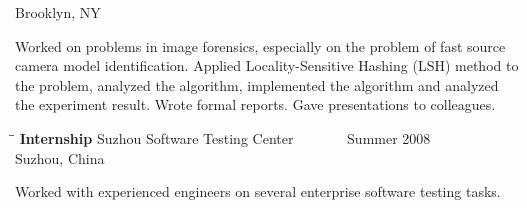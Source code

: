 \documentclass{res}
\begin{document}
\begin{resume}
\begin{tabbing}
                             \>Brooklyn, NY
   \end{tabbing}\vspace{-20pt}      %
     Worked on problems in image forensics, especially on the problem of fast source camera model identification. Applied Locality-Sensitive Hashing (LSH) method to the problem, analyzed the algorithm, implemented the algorithm and analyzed the experiment result. Wrote formal reports. Gave presentations to colleagues. 
   \begin{tabbing}%
   \hspace{2.3in}\= \hspace{2.6in}\= \kill %
   {\bf Internship}  \>Suzhou Software Testing Center\> ~~~~~~~Summer  2008\\
                          \>Suzhou, China
   \end{tabbing}\vspace{-20pt}
    Worked with experienced engineers on several enterprise software testing tasks.   \\
        

\end{resume}
\end{document}

